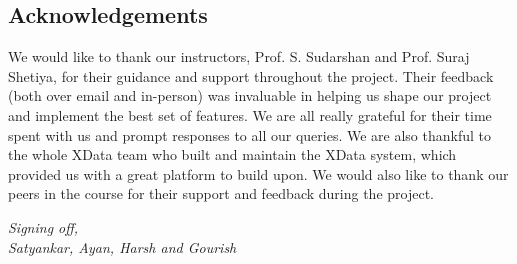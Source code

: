 \documentclass[11pt]{article}
\begin{document}
\subsection{Acknowledgements}

We would like to thank our instructors, Prof. S. Sudarshan and Prof. Suraj Shetiya, for their guidance and support throughout the project. Their feedback (both over email and in-person) was invaluable in helping us shape our project and implement the best set of features. We are all really grateful for their time spent with us and prompt responses to all our queries. We are also thankful to the whole XData team who built and maintain the XData system, which provided us with a great platform to build upon. We would also like to thank our peers in the course for their support and feedback during the project.

\vspace{5em}

\textit{Signing off, \\
Satyankar, Ayan, Harsh and Gourish}
\end{document}

